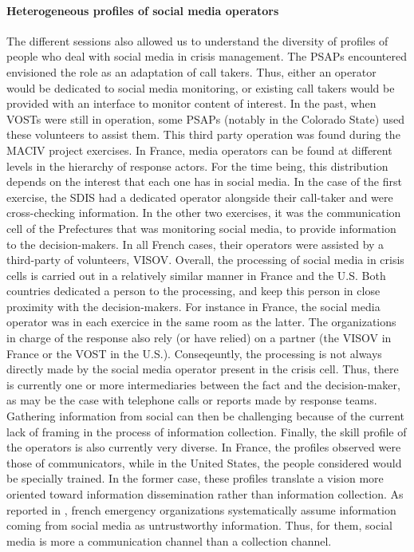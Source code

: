 \paragraph{Heterogeneous profiles of social media operators}
The different sessions also allowed us to understand the diversity of profiles of people who deal with social media in crisis management.
The PSAPs encountered envisioned the role as an adaptation of call takers.
Thus, either an operator would be dedicated to social media monitoring, or existing call takers would be provided with an interface to monitor content of interest.
In the past, when VOSTs were still in operation, some PSAPs (notably in the Colorado State) used these volunteers to assist them.
This third party operation was found during the MACIV project exercises.
In France, media operators can be found at different levels in the hierarchy of response actors.
For the time being, this distribution depends on the interest that each one has in social media.
In the case of the first exercise, the SDIS had a dedicated operator alongside their call-taker and were cross-checking information.
In the other two exercises, it was the communication cell of the Prefectures that was monitoring social media, to provide information to the decision-makers.
In all French cases, their operators were assisted by a third-party of volunteers, VISOV.
Overall, the processing of social media in crisis cells is carried out in a relatively similar manner in France and the U.S.
Both countries dedicated a person to the processing, and keep this person in close proximity with the decision-makers.
For instance in France, the social media operator was in each exercice in the same room as the latter.
The organizations in charge of the response also rely (or have relied) on a partner (the VISOV in France or the VOST in the U.S.).
Conseqeuntly, the processing is not always directly made by the social media operator present in the crisis cell.
Thus, there is currently one or more intermediaries between the fact and the decision-maker, as may be the case with telephone calls or reports made by response teams.
Gathering information from social can then be challenging because of the current lack of framing in the process of information collection.
Finally, the skill profile of the operators is also currently very diverse.
In France, the profiles observed were those of communicators, while in the United States, the people considered would be specially trained.
In the former case, these profiles translate a vision more oriented toward information dissemination rather than information collection.
As reported in \textcite{castagninoWhatCanWe2019}, french emergency organizations systematically assume information coming from social media as untrustworthy information.
Thus, for them, social media is more a communication channel than a collection channel.

